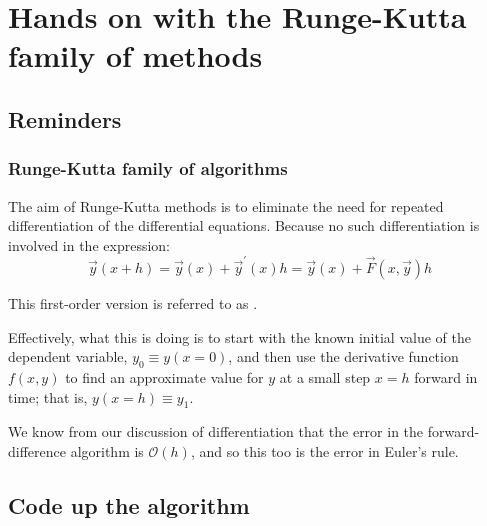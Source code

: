 \documentclass[hyperref={colorlinks=true}]{beamer}
\begin{document}
\section[Hands on with the Runge-Kutta family of methods]{Hands on with the Runge-Kutta family of methods}

\subsection[Reminders]{Reminders}

\begin{frame}%
  \frametitle{Runge-Kutta family of algorithms}

  The aim of Runge-Kutta methods is to eliminate the need for repeated differentiation of the differential equations. Because no such differentiation is involved in the  expression:
  \begin{equation}
    \vec{y}(x + h) = \vec{y}(x) + \vec{y}^{\prime}(x)h = \vec{y}(x) + \vec{F}(x, \vec{y})h
  \end{equation}
  
  This first-order version is referred to as .
  
  \mysp
  
  Effectively, what this is doing is to start with the known initial value of the dependent variable, $y_0 \equiv y(x = 0)$, and then use the derivative function $f(x,y)$ to find an approximate value for $y$ at a small step $x = h$ forward in time; that is, $y(x = h) \equiv y_1$. 
  
  \mysp
  
  We know from our discussion of differentiation that the error in the forward-difference algorithm is $\mathcal{O}(h)$, and so this too is the error in Euler's rule.
  
    \centering \Large {}

\end{frame}

\subsection[Code up the algorithm]{Code up the algorithm}
\end{document}
